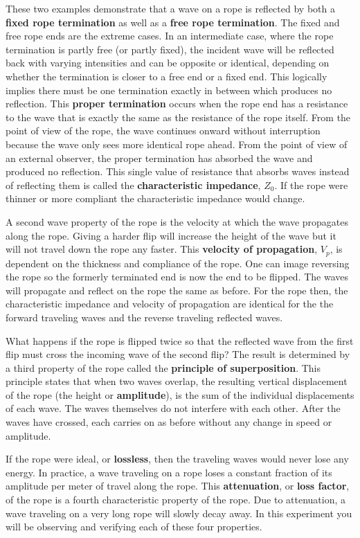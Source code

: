 These two examples demonstrate that a wave on a rope is reflected by both a {\bf fixed rope termination} as well as a {\bf free rope termination}. The fixed and free rope ends are the extreme cases. In an intermediate case, where the rope termination is partly free (or partly fixed), the incident wave will be reflected back with varying intensities and can be opposite or identical, depending on whether the termination is closer to a free end or a fixed end. This logically implies there must be one termination exactly in between which produces no reflection. This {\bf proper termination} occurs when the rope end has a resistance to the wave that is exactly the same as the resistance of the rope itself. From the point of view of the rope, the wave continues onward without interruption because the wave only sees more identical rope ahead. From the point of view of an external observer, the proper termination has absorbed the wave and produced no reflection. This single value of resistance that absorbs waves instead of reflecting them is called the {\bf characteristic impedance}, $Z_0$. If the rope were thinner or more compliant the characteristic impedance would change. 

A second wave property of the rope is the velocity at which the wave propagates along the rope. Giving a harder flip will increase the height of the wave but it will not travel down the rope any faster. This {\bf velocity of propagation}, $V_p$, is dependent on the thickness and compliance of the rope. One can image reversing the rope so the formerly terminated end is now the end to be flipped. The waves will propagate and reflect on the rope the same as before. For the rope then, the characteristic impedance and velocity of propagation are identical for the the forward traveling waves and the reverse traveling reflected waves.

What happens if the rope is flipped twice so that the reflected wave from the first flip must cross the incoming wave of the second flip? The result is determined by a third property of the rope called the {\bf principle of superposition}. This principle states that when two waves overlap, the resulting vertical displacement of the rope (the height or {\bf amplitude}), is the sum of the individual displacements of each wave. The waves themselves do not interfere with each other. After the waves have crossed, each carries on as before without any change in speed or amplitude.

If the rope were ideal, or {\bf lossless}, then the traveling waves would never lose any energy. In practice, a wave traveling on a rope loses a constant fraction of its amplitude per meter of travel along the rope. This {\bf attenuation}, or {\bf loss factor}, of the rope is a fourth characteristic  property of the rope. Due to attenuation, a wave traveling on a very long rope will slowly decay away. In this experiment you will be observing and verifying each of these four properties.

